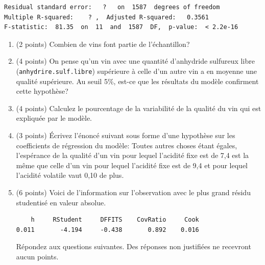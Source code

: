 \documentclass[11pt]{article}
\begin{document}
{\begin{enumerate}
\begin{verbatim}
Residual standard error:   ?   on  1587  degrees of freedom
Multiple R-squared:    ? ,	Adjusted R-squared:   0.3561 
F-statistic:  81.35  on  11  and  1587  DF,  p-value:  < 2.2e-16    
\end{verbatim}

\begin{enumerate}
    \item (2 points) Combien de vins font partie de l'échantillon?
    \vspace{1in}
    \item (4 points) On pense qu'un vin avec une quantité d'anhydride sulfureux libre (\texttt{anhydrire.sulf.libre}) supérieure à celle d'un autre vin a en moyenne une qualité supérieure. Au seuil 5\%, est-ce que les résultats du modèle confirment cette hypothèse?
    \vspace{2in}
    \item (4 points) Calculez le pourcentage de la variabilité de la qualité du vin qui est expliquée par le modèle.
    \vspace{2.6in}
    \item (3 points) Écrivez l'énoncé suivant sous forme d'une hypothèse sur les coefficients de régression du modèle:
    Toutes autres choses étant égales, l'espérance de la qualité d'un vin pour lequel l'acidité fixe est de 7,4 est la même que celle d'un vin pour lequel l'acidité fixe est de 9,4 et pour lequel l'acidité volatile vaut 0,10 de plus.
    \vspace{2in}
    \newpage
    \item (6 points) Voici de l'information sur l'observation avec le plus grand résidu studentisé en valeur absolue.
    
    \begin{verbatim}
    h     RStudent     DFFITS    CovRatio     Cook
0.011       -4.194     -0.438       0.892    0.016
    \end{verbatim}
    Répondez aux questions suivantes. Des réponses non justifiées ne recevront aucun points.
    

\end{enumerate}
\end{enumerate}}
\end{document}

